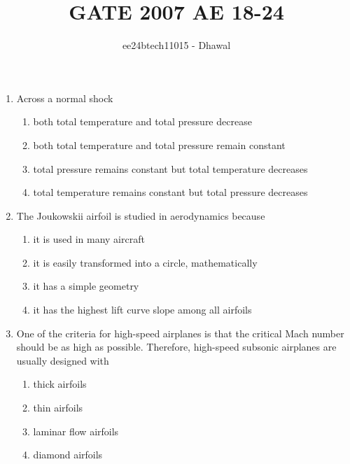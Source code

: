 \documentclass[journal]{IEEEtran}
\theoremstyle{remark}
\begin{document}

\onecolumn

\title{GATE 2007 AE 18-24}
\author{ee24btech11015 - Dhawal}
\maketitle

\renewcommand{\thefigure}{\theenumi}
\renewcommand{\thetable}{\theenumi}

\begin{enumerate}[start=18]
	\item Across a normal shock
\begin{enumerate}
\item both total temperature and total pressure decrease 
\item both total temperature and total pressure remain constant 
\item total pressure remains constant but total temperature decreases 
\item total temperature remains constant but total pressure decreases
\end{enumerate}

\item  The Joukowskii airfoil is studied in aerodynamics because
\begin{enumerate}
\item it is used in many aircraft
\item it is easily transformed into a circle, mathematically
\item it has a simple geometry
\item it has the highest lift curve slope among all airfoils
\end{enumerate}

\item  One of the criteria for high-speed airplanes is that the critical Mach number should be as high as possible. Therefore, high-speed subsonic airplanes are usually designed with 
\begin{multicols}{2}
\begin{enumerate}
\item thick airfoils
\item thin airfoils
\item laminar flow airfoils
\item diamond airfoils
\end{enumerate}
\end{multicols}


\end{enumerate}
\end{document}
